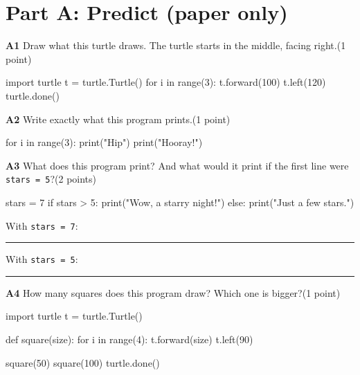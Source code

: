 \documentclass[level=1]{kidscode}
\newcommand{\qnum}[1]{\textbf{\color{kcaccent}#1}\quad}
\newcommand{\pts}[1]{\hfill{\small(#1)}}
\begin{document}
\namedateline

\section{Part A: Predict (paper only)}
\qnum{A1} Draw what this turtle draws. The turtle starts in the middle, facing right.\pts{1 point}\par
\begin{minipage}[t]{0.5\linewidth}
\begin{pycode}
import turtle
t = turtle.Turtle()
for i in range(3):
    t.forward(100)
    t.left(120)
turtle.done()
\end{pycode}
\end{minipage}\hfill
\begin{minipage}[t]{0.46\linewidth}\vspace{2pt}
\answerspace{3.6cm}
\end{minipage}

\qnum{A2} Write exactly what this program prints.\pts{1 point}\par
\begin{minipage}[t]{0.5\linewidth}
\begin{pycode}
for i in range(3):
    print("Hip")
print("Hooray!")
\end{pycode}
\end{minipage}\hfill
\begin{minipage}[t]{0.46\linewidth}\vspace{2pt}
\answerspace{2.8cm}
\end{minipage}

\qnum{A3} What does this program print? And what would it print if the first line were \texttt{stars = 5}?\pts{2 points}
\begin{pycode}
stars = 7
if stars > 5:
    print("Wow, a starry night!")
else:
    print("Just a few stars.")
\end{pycode}
With \texttt{stars = 7}: \rule{8cm}{0.4pt}\par\medskip
With \texttt{stars = 5}: \rule{8cm}{0.4pt}

\qnum{A4} How many squares does this program draw? Which one is bigger?\pts{1 point}
\begin{pycode}
import turtle
t = turtle.Turtle()

def square(size):
    for i in range(4):
        t.forward(size)
        t.left(90)

square(50)
square(100)
turtle.done()
\end{pycode}
\end{document}
